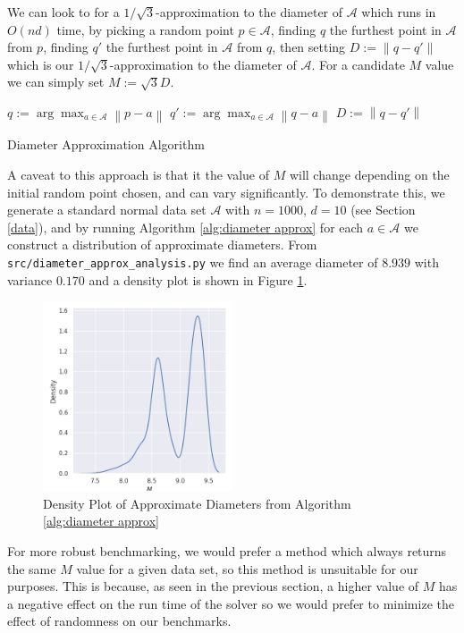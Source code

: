 \documentclass[11pt,twoside]{report}
\newcommand{\A}{\mathcal{A}} %
\newcommand{\norm}[1]{\left\lVert#1\right\rVert} %
\theoremstyle{definition}
\numberwithin{theorem}{section}
\numberwithin{definition}{section}
\numberwithin{lemma}{section}
\numberwithin{proposition}{section}
\numberwithin{equation}{section}
\numberwithin{figure}{section}
\begin{document}
We can look to \cite[Lemma 1]{core-sets} for a $1/\sqrt{3}$-approximation to the diameter of $\A$ which runs in $O(nd)$ time, by picking a random point $p\in\A$, finding $q$ the furthest point in $\A$ from $p$, finding $q'$ the furthest point in $\A$ from $q$, then setting $D:=\norm{q-q'}$ which is our $1/\sqrt{3}$-approximation to the diameter of $\A$. For a candidate $M$ value we can simply set $M:=\sqrt{3}D$.

\begin{algorithm}[H]\label{alg:diameter approx}
    \KwIn{Data set $\A$, point $p\in\A$}
    $q:=\arg\max_{a\in\A}\norm{p-a}$\;
    $q':=\arg\max_{a\in\A}\norm{q-a}$\;
    $D:=\norm{q-q'}$\;
    \;
    
    \caption{Diameter Approximation Algorithm \cite[Lemma 1]{core-sets}}
\end{algorithm}
A caveat to this approach is that it the value of $M$ will change depending on the initial random point chosen, and can vary significantly. To demonstrate this, we generate a standard normal data set $\A$ with $n=1000$, $d=10$ (see Section \ref{data}), and by running Algorithm \ref{alg:diameter approx} for each $a\in\A$ we construct a distribution of approximate diameters. From \texttt{src/diameter\_approx\_analysis.py} we find an average diameter of $8.939$ with variance $0.170$ and a density plot is shown in Figure \ref{fig:diameter approx density}.

\begin{figure}
    \centering
    \includegraphics[width=0.5\textwidth]{pw_M_density.png}
    \caption{Density Plot of Approximate Diameters from Algorithm \ref{alg:diameter approx}}
    \label{fig:diameter approx density}
\end{figure}

For more robust benchmarking, we would prefer a method which always returns the same $M$ value for a given data set, so this method is unsuitable for our purposes. This is because, as seen in the previous section, a higher value of $M$ has a negative effect on the run time of the solver so we would prefer to minimize the effect of randomness on our benchmarks.
\end{document}
